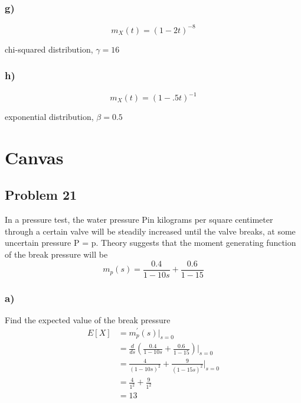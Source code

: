 \documentclass{article}
\begin{document}
\subsubsection*{g)}
\begin{equation}
    m_X(t) = (1-2t)^{-8}
\end{equation}
\begin{center}
    chi-squared distribution,
    $\gamma = 16$
\end{center}
\subsubsection*{h)}
\begin{equation}
    m_X(t) = (1-.5t)^{-1}
\end{equation}
\begin{center}
    exponential distribution,
    $\beta = 0.5$
\end{center}
\newpage
\section*{Canvas}
\subsection*{Problem 21}
In a pressure test, the water pressure Pin kilograms per square centimeter through a certain valve will be steadily increased until the valve breaks, at some uncertain pressure P = p. Theory suggests that the moment generating function of the break pressure will be 
\begin{equation}
    m_p(s) = \frac{0.4}{1 -1 0s} + \frac{0.6}{1-15}
\end{equation}
\subsubsection*{a)}
Find the expected value of the break pressure      
\begin{align}
    E[X] &= m^{'}_p(s)\bigg|_{s=0} \\
    &= \frac{d}{ds}\left(\frac{0.4}{1 -1 0s} + \frac{0.6}{1-15}\right)\bigg|_{s=0} \\
    &= \frac{4}{\left(1-10s\right)^2}+\frac{9}{\left(1-15s\right)^2}\bigg|_{s=0}\\
    &= \frac{4}{1^2}+\frac{9}{1^2}\\
    &= \boxed {13}
\end{align}
\end{document}

